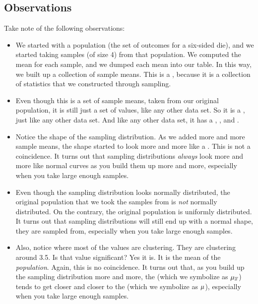 \documentclass[../../../main.tex]{subfiles}
\begin{document}
\subsection{Observations}

Take note of the following observations:

\begin{itemize}

  \item We started with a population (the set of outcomes for a six-sided die), and we started taking samples (of size 4) from that population. We computed the mean for each sample, and we dumped each mean into our table. In this way, we built up a collection of sample means. This is a , because it is a collection of statistics that we constructed through sampling.

  \item Even though this is a set of sample means, taken from our original population, it is still just a set of values, like any other data set. So it is a , just like any other data set. And like any other data set, it has a , , and .

  \item Notice the shape of the sampling distribution. As we added more and more sample means, the shape started to look more and more like a . This is not a coincidence. It turns out that sampling distributions \emph{always} look more and more like normal curves as you build them up more and more, especially when you take large enough samples. 
  
  \item Even though the sampling distribution looks normally distributed, the original population that we took the samples from is \emph{not} normally distributed. On the contrary, the original population is uniformly distributed. It turns out that sampling distributions will still end up with a normal shape,  they are sampled from, especially when you take large enough samples.

  \item Also, notice where most of the values are clustering. They are clustering around 3.5. Is that value significant? Yes it is. It is the mean of the \emph{population}. Again, this is no coincidence. It turns out that, as you build up the sampling distribution more and more, the  (which we symbolize as $\SamplingMean/$) tends to get closer and closer to the  (which we symbolize as $\mu$), especially when you take large enough samples.

\end{itemize}
\end{document}
